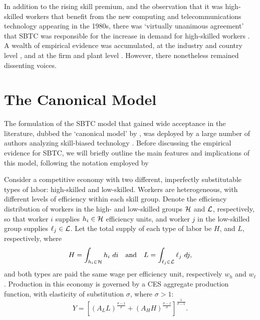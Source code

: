 In addition to the rising skill premium, and the observation that it was high-skilled workers that benefit from the new computing and telecommunications technology appearing in the 1980s, there was `virtually unanimous agreement' that SBTC was responsible for the increase in demand for high-skilled workers \citep[p.41]{Johnson1997}. A wealth of empirical evidence was accumulated, at the industry and country level \citep{Berman1994,Autor1998,Berman1998}, and at the firm and plant level \citep{Levy1996,Bresnahan2002}. However, there nonetheless remained dissenting voices.

\section{The Canonical Model}

The formulation of the SBTC model that gained wide acceptance in the literature, dubbed the `canonical model' by \citet{Acemoglu2011},  was deployed by a large number of authors analyzing skill-biased technology \citep[e.g.]{Katz1992,Goldin2007}. %
Before discussing the empirical evidence for SBTC, we will briefly outline the main features and implications of this model, following the notation employed by \citet{Acemoglu2011}

Consider a competitive economy with two different, imperfectly substitutable types of labor: high-skilled and low-skilled. Workers are heterogeneous, with different levels of efficiency within each skill group. Denote the efficiency distribution of workers in the high- and low-skilled groups $\mathcal{H}$ and $\mathcal{L}$, respectively, so that worker $i$ supplies $h_i\in\mathcal{H}$ efficiency units, and worker $j$ in the low-skilled group supplies $\ell_j\in\mathcal{L}$. Let the total supply of each type of labor be $H$, and $L$, respectively, where
$$
    H = \int_{h_i \in \sH} h_i\ di \quad\text{and}\quad L = \int_{\ell_j \in \sL} \ell_j\ dj,
$$
and both types are paid the same wage per efficiency unit, respectively $w_h$ and $w_\ell$. Production in this economy is governed by a CES aggregate production function, with elasticity of substitution $\sigma$, where $\sigma>1$:
\begin{equation}  \label{eq:prod}
Y = \left[
  \left(A_LL \right)^\frac{\sigma-1}{\sigma}
  +
  \left(A_HH \right)^\frac{\sigma-1}{\sigma}
  \right]^\frac{1}{\sigma-1}.
\end{equation}

